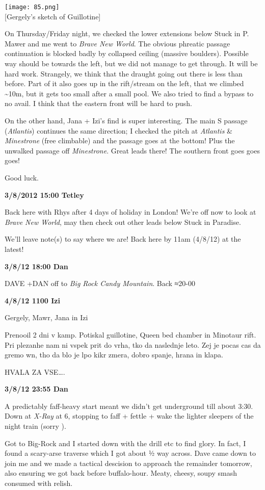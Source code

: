 \texttt{[image: 85.png]}\\
{[}Gergely's sketch of Guillotine{]}

On Thursday/Friday night, we checked the lower extensions below Stuck in
P. Mawer and me went to \emph{Brave New World}. The obvious phreatic
passage continuation is blocked badly by collapsed ceiling (massive
boulders). Possible way should be towards the left, but we did not
manage to get through. It will be hard work. Strangely, we think that
the draught going out there is less than before. Part of it also goes up
in the rift/stream on the left, that we climbed \textasciitilde{}10m,
but it gets too small after a small pool. We also tried to find a bypass
to no avail. I think that the eastern front will be hard to push.

On the other hand, Jana + Izi's find is super interesting. The main S
passage (\emph{Atlantis}) continues the same direction; I checked the
pitch at \emph{Atlantis} \& \emph{Minestrone} (free climbable) and the
passage goes at the bottom! Plus the unwalked passage off
\emph{Minestrone}. Great leads there! The southern front goes goes goes!

Good luck.

\textbf{3/8/2012 15:00 Tetley}

Back here with Rhys after 4 days of holiday in London! We're off now to
look at \emph{Brave New World}, may then check out other leads below
Stuck in Paradise.

We'll leave note(s) to say where we are! Back here by 11am (4/8/12) at
the latest!

\textbf{3/8/12 18:00 Dan}

DAVE +DAN off to \emph{Big Rock Candy Mountain}. Back ≈20-00

\textbf{4/8/12 1100 Izi}

Gergely, Mawr, Jana in Izi

Prenooil 2 dni v kamp. Potiskal guillotine, Queen bed chamber in
Minotaur rift. Pri plezanhe nam ni vspek prit do vrha, tko da naslednje
leto. Zej je pocas cas da gremo wn, tho da blo je lpo kikr zmera, dobro
spanje, hrana in klapa.

HVALA ZA VSE\ldots{}.

\textbf{3/8/12 23:55 Dan}

A predictably faff-heavy start meant we didn't get underground till
about 3:30. Down at \emph{X-Ray} at 6, stopping to faff + fettle + wake
the lighter sleepers of the night train (sorry ).

Got to Big-Rock and I started down with the drill etc to find glory. In
fact, I found a scary-arse traverse which I got about ½ way across. Dave
came down to join me and we made a tactical descision to approach the
remainder tomorrow, also ensuring we got back before buffalo-hour.
Meaty, cheesy, soupy smash consumed with relish.

